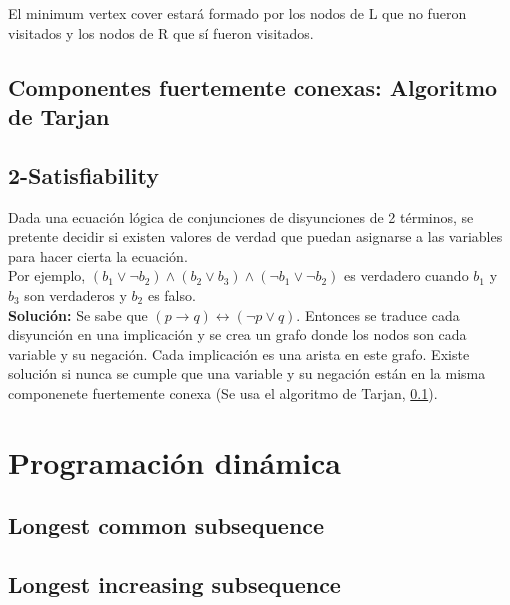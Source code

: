 \documentclass[10pt,letterpaper,twocolumn]{article}
\newcommand{\codigofuente}[1]{

\dotfill
}
\begin{document}
El minimum vertex cover estará formado por los nodos de L que no fueron visitados y los nodos de R que sí fueron visitados.

\codigofuente{./src/grafos/konig.cpp}

\subsection{Componentes fuertemente conexas: Algoritmo de Tarjan}
\label{tarjan}
\codigofuente{./src/grafos/tarjan.cpp}

\subsection{2-Satisfiability}
Dada una ecuación lógica de conjunciones de disyunciones de 2 términos, se pretente decidir si existen valores de verdad que puedan asignarse a las variables para hacer cierta la ecuación. \\
Por ejemplo, $(b_1 \vee \neg b_2) \wedge (b_2 \vee b_3) \wedge (\neg b_1 \vee \neg b_2) $ es verdadero cuando $b_1$ y $b_3$ son verdaderos y $b_2$ es falso. \\
\textbf{Solución:} Se sabe que $(p \rightarrow q) \leftrightarrow (\neg p \vee q)$. Entonces se traduce cada disyunción en una implicación y se crea un grafo donde los nodos son cada variable y su negación. Cada implicación es una arista en este grafo. Existe solución si nunca se cumple que una variable y su negación están en la misma componenete fuertemente conexa (Se usa el algoritmo de Tarjan, \ref{tarjan}).

\section{Programación dinámica}
\subsection{Longest common subsequence}
\codigofuente{./src/dp/lcs.cpp}
\subsection{Longest increasing subsequence}
\codigofuente{./src/dp/lis.cpp}
\end{document}
